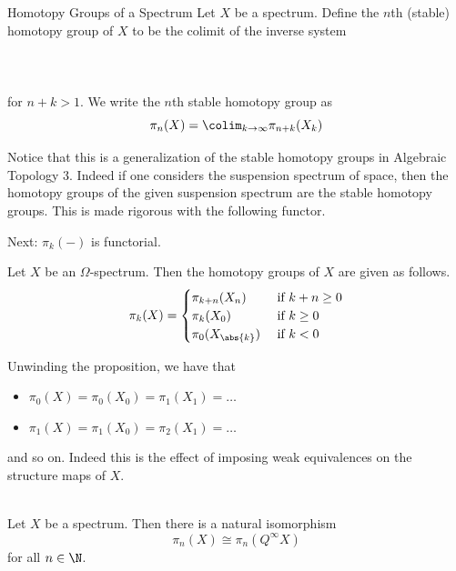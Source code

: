 \documentclass[a4paper]{article}
\begin{document}
\begin{defn}{Homotopy Groups of a Spectrum}{} Let $X$ be a spectrum. Define the $n$th (stable) homotopy group of $X$ to be the colimit of the inverse system \\~\\
\\~\\
for $n+k>1$. We write the $n$th stable homotopy group as $$\pi_n(X)=\colim_{k\to\infty}\pi_{n+k}(X_k)$$
\end{defn}

Notice that this is a generalization of the stable homotopy groups in Algebraic Topology 3. Indeed if one considers the suspension spectrum of space, then the homotopy groups of the given suspension spectrum are the stable homotopy groups. This is made rigorous with the following functor. 

Next: $\pi_k(-)$ is functorial. 

\begin{prp}{}{} Let $X$ be an $\Omega$-spectrum. Then the homotopy groups of $X$ are given as follows. $$\pi_k(X)=\begin{cases}
\pi_{k+n}(X_n) & \text{ if } k+n\geq 0\\
\pi_k(X_0) & \text{ if } k\geq 0\\
\pi_0(X_{\abs{k}}) & \text{ if } k<0
\end{cases}$$
\end{prp}

Unwinding the proposition, we have that 
\begin{itemize}
\item $\pi_0(X)=\pi_0(X_0)=\pi_1(X_1)=\dots$
\item $\pi_1(X)=\pi_1(X_0)=\pi_2(X_1)=\dots$
\end{itemize}
and so on. Indeed this is the effect of imposing weak equivalences on the structure maps of $X$. 

\begin{prp}{}{}\\
Let $X$ be a spectrum. Then there is a natural isomorphism $$\pi_n(X)\cong\pi_n(Q^\infty X)$$ for all $n\in\N$. 
\end{prp}
\end{document}
